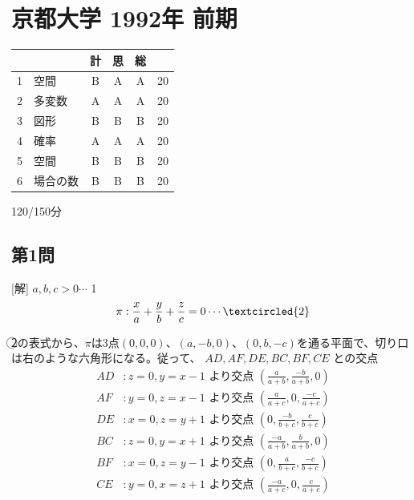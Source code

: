 \documentclass[../main.tex]{subfiles}
\begin{document}
\section*{京都大学 1992年 前期}
\begin{center}
  \begin{tabular}{|c|l|c|c|c|c|}
    \multicolumn{2}{c|}{} & 計 & 思 & 総 & \multicolumn{1}{c}{} \\ \hline
    1 & 空間 & B & A & A & 20 \\ \hline
    2 & 多変数 & A & A & A & 20 \\ \hline
    3 & 図形 & B & B & B & 20 \\ \hline
    4 & 確率 & A & A & A & 20 \\ \hline
    5 & 空間 & B & B & B & 20 \\ \hline
    6 & 場合の数 & B & B & B & 20 \\ \hline
  \end{tabular}
\end{center}
\begin{flushright}
  120/150分
\end{flushright}

\subsection*{第1問}
[解] $a,b,c>0 \cdots$ \textcircled{1}
\begin{equation*}
  \pi : \frac{x}{a} + \frac{y}{b} + \frac{z}{c} = 0 \cdots \textcircled{2}
\end{equation*}

\textcircled{2}の表式から、$\pi$は3点$(0,0,0)$、$(a,-b,0)$、$(0,b,-c)$を通る平面で、切り口は右のような六角形になる。従って、
$AD, AF, DE, BC, BF, CE$
との交点
\begin{align*}
  AD &: z=0, y=x-1 \text{ より交点 } \left(\frac{a}{a+b}, \frac{-b}{a+b}, 0\right) \\
  AF &: y=0, z=x-1 \text{ より交点 } \left(\frac{a}{a+c}, 0, \frac{-c}{a+c}\right) \\
  DE &: x=0, z=y+1 \text{ より交点 } \left(0, \frac{-b}{b+c}, \frac{c}{b+c}\right) \\
  BC &: z=0, y=x+1 \text{ より交点 } \left(\frac{-a}{a+b}, \frac{b}{a+b}, 0\right) \\
  BF &: x=0, z=y-1 \text{ より交点 } \left(0, \frac{a}{b+c}, \frac{-c}{b+c}\right) \\
  CE &: y=0, x=z+1 \text{ より交点 } \left(\frac{-a}{a+c}, 0, \frac{c}{a+c}\right)
\end{align*}
\end{document}
